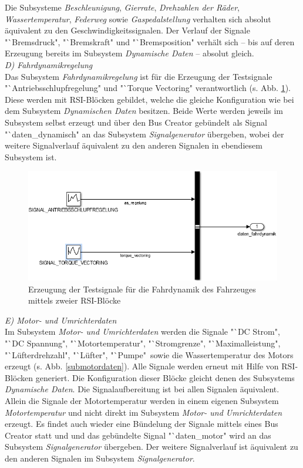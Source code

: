 \documentclass[fontsize = 12pt, paper = a4]{scrreprt}
\begin{document}
Die Subsysteme \textit{Beschleunigung}, \textit{Gierrate}, \textit{Drehzahlen der Räder}, \textit{Wassertemperatur}, \textit{Federweg} sowie \textit{Gaspedalstellung} verhalten sich absolut äquivalent zu den Geschwindigkeitssignalen.
Der Verlauf der Signale "`Bremsdruck", "`Bremskraft" und "`Bremsposition" verhält sich -- bis auf deren Erzeugung bereits im Subsystem \textit{Dynamische Daten} -- absolut gleich. \\

\textit{D) Fahrdynamikregelung} \\

Das Subsystem \textit{Fahrdynamikregelung} ist für die Erzeugung der Testsignale "`Antriebsschlupfregelung" und "`Torque Vectoring" verantwortlich (s. Abb. \ref{makefahrdynamik}). Diese werden mit RSI-Blöcken gebildet, welche die gleiche Konfiguration wie bei dem Subsystem \textit{Dynamischen Daten} besitzen. Beide Werte werden jeweils im Subsystem selbst erzeugt und über den Bus Creator gebündelt als Signal "`daten\_dynamisch" an das Subsystem \textit{Signalgenerator} übergeben, wobei der weitere Signalverlauf äquivalent zu den anderen Signalen in ebendiesem Subsystem ist.

\newpage

\begin{figure}[h]
\centering
\includegraphics[scale = 0.75]{makefahrdynamik}
\caption[Generierung der Testsignale für die Fahrdynamik des Fahrzeuges]{Erzeugung der Testsignale für die Fahrdynamik des Fahrzeuges mittels zweier RSI-Blöcke}
\label{makefahrdynamik}
\end{figure}

\textit{E) Motor- und Umrichterdaten} \\

Im Subsystem \textit{Motor- und Umrichterdaten} werden die Signale "`DC Strom", "`DC Spannung", "`Motortemperatur", "`Stromgrenze", "`Maximalleistung", "`Lüfterdrehzahl", "`Lüfter", "`Pumpe"\ sowie die Wassertemperatur des Motors erzeugt (s. Abb. \ref{submotordaten}). Alle Signale werden erneut mit Hilfe von RSI-Blöcken generiert. Die Konfiguration dieser Blöcke gleicht denen des Subsystems \textit{Dynamische Daten}. Die Signalaufbereitung ist bei allen Signalen äquivalent. Allein die Signale der Motortemperatur werden in einem eigenen Subsystem \textit{Motortemperatur} und nicht direkt im Subsystem \textit{Motor- und Umrichterdaten} erzeugt. Es findet auch wieder eine Bündelung der Signale mittels eines Bus Creator statt und und das gebündelte Signal "`daten\_motor" wird an das Subsystem \textit{Signalgenerator} übergeben. Der weitere Signalverlauf ist äquivalent zu den anderen Signalen im Subsystem \textit{Signalgenerator}.
\end{document}
